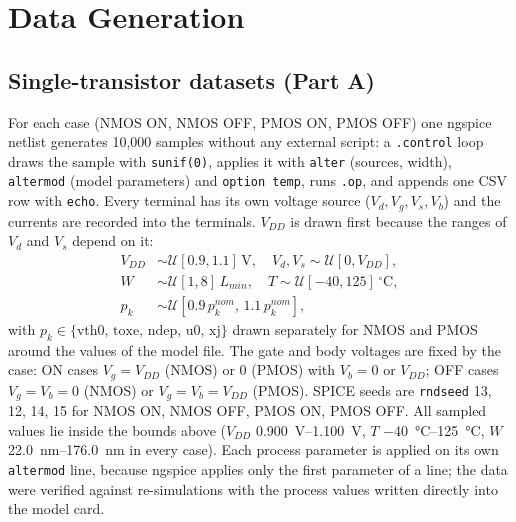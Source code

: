 \section{Data Generation}\label{sec:data}

\subsection{Single-transistor datasets (Part A)}\label{sec:data:gen}
For each case (NMOS ON, NMOS OFF, PMOS ON, PMOS OFF) one ngspice netlist generates 10,000 samples without any external script: a \texttt{.control} loop draws the sample with \texttt{sunif(0)}, applies it with \texttt{alter} (sources, width), \texttt{altermod} (model parameters) and \texttt{option temp}, runs \texttt{.op}, and appends one CSV row with \texttt{echo}. Every terminal has its own voltage source ($V_d,V_g,V_s,V_b$) and the currents are recorded into the terminals. $V_{DD}$ is drawn first because the ranges of $V_d$ and $V_s$ depend on it:
\begin{align}
V_{DD}&\sim\mathcal U[0.9,1.1]\,\text{V},\quad V_d,V_s\sim\mathcal U[0,V_{DD}],\nonumber\\
W&\sim\mathcal U[1,8]\,L_{min},\quad T\sim\mathcal U[-40,125]\,^\circ\text{C},\nonumber\\
p_k&\sim\mathcal U[0.9\,p_k^{nom},\,1.1\,p_k^{nom}],
\end{align}
with $p_k\in\{\text{vth0, toxe, ndep, u0, xj}\}$ drawn separately for NMOS and PMOS around the values of the model file. The gate and body voltages are fixed by the case: ON cases $V_g=V_{DD}$ (NMOS) or 0 (PMOS) with $V_b=0$ or $V_{DD}$; OFF cases $V_g=V_b=0$ (NMOS) or $V_g=V_b=V_{DD}$ (PMOS). SPICE seeds are \texttt{rndseed} 13, 12, 14, 15 for NMOS ON, NMOS OFF, PMOS ON, PMOS OFF.
All sampled values lie inside the bounds above ($V_{DD}$ \SIrange{0.900}{1.100}{\volt}, $T$ \SIrange{-40}{125}{\celsius}, $W$ \SIrange{22.0}{176.0}{\nano\meter} in every case).
Each process parameter is applied on its own \texttt{altermod} line, because ngspice applies only the first parameter of a line; the data were verified against re-simulations with the process values written directly into the model card.

